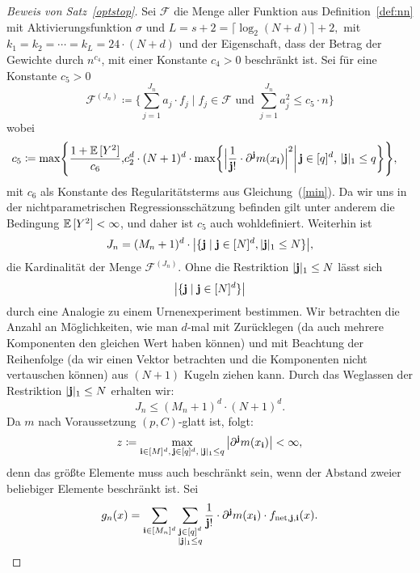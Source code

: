 \begin{proof}[Beweis von Satz~\ref{optstop}]
Sei $\mathcal{F}$ die Menge aller Funktion aus Definition~\ref{def:nn} mit Aktivierungsfunktion $\sigma$ und $L = s + 2 = \lceil\log_2(N + d)\rceil + 2,$ mit $k_1 = k_2 = \cdots = k_L = 24 \cdot (N + d)$ und der Eigenschaft, dass der Betrag der Gewichte durch $n^{c_{4}}$, mit einer Konstante $c_4 > 0$ beschränkt ist. Sei  für eine Konstante $c_5 > 0$
$$ \mathcal{F}^{(J_n)} \coloneqq \biggl\{\sum_{j = 1}^{J_n} a_j \cdot f_j \mid f_j \in \mathcal{F} \text{ und } \sum_{j = 1}^{J_n} a_j^2 \leq c_5 \cdot n \biggr\}$$
wobei
\begin{equation}
\label{constantc21}
\begin{split}
c_5 \coloneqq \max\Biggl\{\frac{1 + \mathbb{E}\,[Y^2]}{c_6}, & c_2^d \cdot (N + 1)^d \cdot \max\biggl\{\Big| \frac{1}{\mathbf{j}!} \cdot \partial^{\mathbf{j}}m(x_{\mathbf{i}})\Big|^2 \bigg| \, \mathbf{j} \in [q]^d,\, |\mathbf{j}|_1 \leq q\biggr\}\Biggr\},
\end{split}
\end{equation}
mit $c_6$ als Konstante des Regularitätsterms aus Gleichung~(\ref{min}). Da wir uns in der nichtparametrischen Regressionsschätzung befinden gilt unter anderem die Bedingung $\mathbb{E}\,[Y^2] < \infty$, und daher ist $c_5$ auch wohldefiniert.
Weiterhin ist
$$J_n = (M_n + 1)^d \cdot \big|\{\mathbf{j} \mid \mathbf{j} \in [N]^d, |\mathbf{j}|_1 \leq N\}\big|,$$ 
die Kardinalität der Menge $\mathcal{F}^{(J_n)}$. 
Ohne die Restriktion $|\mathbf{j}|_1 \leq N$ lässt sich $$\big|\{\mathbf{j} \mid \mathbf{j} \in [N]^d\}\big|$$ durch eine Analogie zu  einem Urnenexperiment bestimmen. Wir betrachten die Anzahl an Möglichkeiten, wie man $d$-mal mit Zurücklegen (da auch mehrere Komponenten den gleichen Wert haben können) und mit Beachtung der Reihenfolge (da wir einen Vektor betrachten und die Komponenten nicht vertauschen können) aus $(N + 1)$ Kugeln ziehen kann. Durch das Weglassen der Restriktion $|\mathbf{j}|_1 \leq N$ erhalten wir:
\begin{equation}
\label{jn}
J_n \leq (M_n + 1)^d \cdot (N + 1)^d.
\end{equation}
Da $m$ nach Voraussetzung $(p,C)$-glatt ist, folgt:
\begin{equation}
\label{bound}
z \coloneqq \max_{\mathbf{i} \in [M]^d,\, \mathbf{j} \in [q]^d,\, |\mathbf{j}|_1 \leq q} \big|\partial^{\mathbf{j}}m(x_{\mathbf{i}})\big| < \infty,
\end{equation}
denn das größte Elemente muss auch beschränkt sein, wenn der Abstand zweier beliebiger Elemente beschränkt ist.
Sei 
$$g_n(x) = \sum_{\mathbf{i} \in [M_n]^d} \sum_{\substack{ \mathbf{j} \in [q]^d \\ |\mathbf{j}|_1 \leq q}} \frac{1}{\mathbf{j}!} \cdot \partial^{\mathbf{j}}m(x_{\mathbf{i}}) \cdot f_{\mathrm{net},\mathbf{j},\mathbf{i}}(x).$$

\end{proof}
